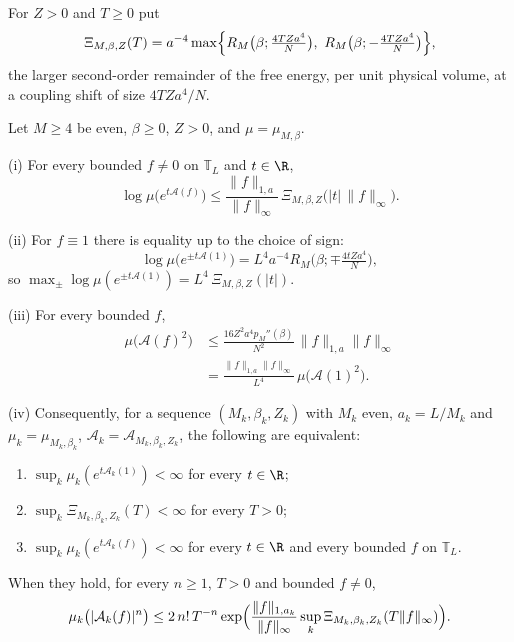 For $Z>0$ and $T\ge0$ put
\[
\Xi_{M,\beta,Z}(T)=a^{-4}\max\Bigl\{R_M\bigl(\beta;\tfrac{4TZa^4}N\bigr),
\ R_M\bigl(\beta;-\tfrac{4TZa^4}N\bigr)\Bigr\},
\]
the larger second-order remainder of the free energy, per unit physical
volume, at a coupling shift of size $4TZa^4/N$.

\begin{theorem}\label{rU7:torus}
Let $M\ge4$ be even, $\beta\ge0$, $Z>0$, and $\mu=\mu_{M,\beta}$.

\textup{(i)} For every bounded $f\ne0$ on $\mathbb T_L$ and $t\in\R$,
\[
\log\mu\bigl(e^{t\mathcal A(f)}\bigr)\le\frac{\|f\|_{1,a}}{\|f\|_\infty}\,
\Xi_{M,\beta,Z}\bigl(|t|\,\|f\|_\infty\bigr) .
\]

\textup{(ii)} For $f\equiv1$ there is equality up to the choice of sign:
\[
\log\mu\bigl(e^{\pm t\mathcal A(1)}\bigr)=L^4a^{-4}R_M\bigl(\beta;\mp
\tfrac{4tZa^4}N\bigr),
\]
so $\max_\pm\log\mu(e^{\pm t\mathcal A(1)})=L^4\,\Xi_{M,\beta,Z}(|t|)$.

\textup{(iii)} For every bounded $f$,
\[
\begin{split}
\mu\bigl(\mathcal A(f)^2\bigr)&\le\frac{16Z^2a^4p_M''(\beta)}{N^2}\,
\|f\|_{1,a}\|f\|_\infty\\
&=\frac{\|f\|_{1,a}\|f\|_\infty}{L^4}\,\mu\bigl(\mathcal A(1)^2\bigr).
\end{split}
\]

\textup{(iv)} Consequently, for a sequence $(M_k,\beta_k,Z_k)$ with $M_k$
even, $a_k=L/M_k$ and $\mu_k=\mu_{M_k,\beta_k}$, $\mathcal A_k=\mathcal
A_{M_k,\beta_k,Z_k}$, the following are equivalent:
\begin{enumerate}[label=\textup{(\alph*)},leftmargin=*]
\item $\sup_k\mu_k(e^{t\mathcal A_k(1)})<\infty$ for every $t\in\R$;
\item $\sup_k\Xi_{M_k,\beta_k,Z_k}(T)<\infty$ for every $T>0$;
\item $\sup_k\mu_k(e^{t\mathcal A_k(f)})<\infty$ for every $t\in\R$ and every
bounded $f$ on $\mathbb T_L$.
\end{enumerate}
When they hold, for every $n\ge1$, $T>0$ and bounded $f\ne0$,
\[
\mu_k\bigl(|\mathcal A_k(f)|^n\bigr)\le2\,n!\,T^{-n}\exp\Bigl(\frac{\|f\|_{1,
a_k}}{\|f\|_\infty}\sup_k\Xi_{M_k,\beta_k,Z_k}(T\|f\|_\infty)\Bigr).
\]
\end{theorem}

